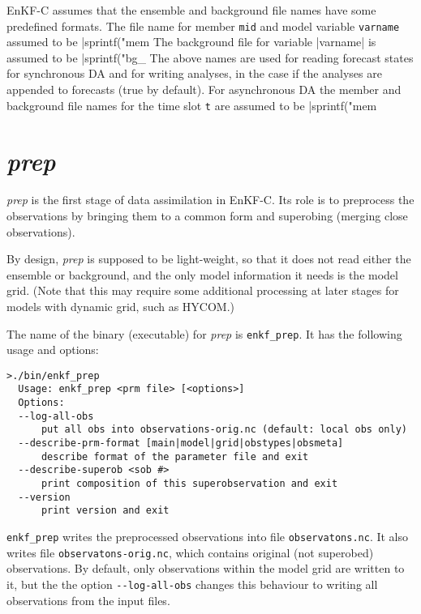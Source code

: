 \documentclass[11pt]{report}
\begin{document}
EnKF-C assumes that the ensemble and background file names have some predefined formats.
The file name for member \verb|mid| and model variable \verb|varname| assumed to be \spverb|sprintf("mem%
The background file for variable \spverb|varname| is assumed to be \spverb|sprintf("bg_%
The above names are used for reading forecast states for synchronous DA and for writing analyses, in the case if the analyses are appended to forecasts (true by default).
For asynchronous DA the member and background file names for the time slot \verb|t| are assumed to be \spverb|sprintf("mem%

\section{\emph{prep}}

\emph{prep} is the first stage of data assimilation in EnKF-C.
Its role is to preprocess the observations by bringing them to a common form and superobing (merging close observations).

By design, \emph{prep} is supposed to be light-weight, so that it does not read either the ensemble or background, and the only model information it needs is the model grid. 
(Note that this may require some additional processing at later stages for models with dynamic grid, such as HYCOM.)

The name of the binary (executable) for \emph{prep} is \verb|enkf_prep|.
It has the following usage and options:
\begin{Verbatim}[frame=single,fontsize=\footnotesize]
>./bin/enkf_prep
  Usage: enkf_prep <prm file> [<options>]
  Options:
  --log-all-obs
      put all obs into observations-orig.nc (default: local obs only)
  --describe-prm-format [main|model|grid|obstypes|obsmeta]
      describe format of the parameter file and exit
  --describe-superob <sob #>
      print composition of this superobservation and exit
  --version
      print version and exit
\end{Verbatim}

\verb|enkf_prep| writes the preprocessed observations into file \verb|observatons.nc|.
It also writes file \verb|observatons-orig.nc|, which contains original (not superobed) observations.
By default, only observations within the model grid are written to it, but the the option \verb|--log-all-obs| changes this behaviour to writing all observations from the input files.
\end{document}
